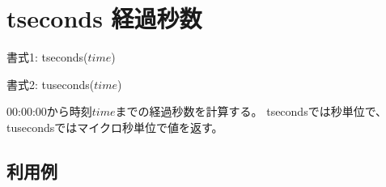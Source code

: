 
%

\section{tseconds 経過秒数\label{sect:tseconds}}

書式1: tseconds($time$)

書式2: tuseconds($time$)

00:00:00から時刻$time$までの経過秒数を計算する。
tsecondsでは秒単位で、tusecondsではマイクロ秒単位で値を返す。

\subsection*{利用例}


%

